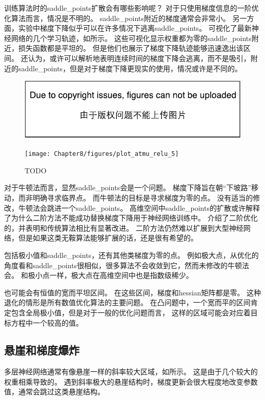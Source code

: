 训练算法时的\gls{saddle_points}扩散会有哪些影响呢？
对于只使用梯度信息的一阶优化算法而言，情况是不明的。
\gls{saddle_points}附近的梯度通常会非常小。
另一方面，实验中梯度下降似乎可以在许多情况下逃离\gls{saddle_points}。
\cite{GoodfellowOptimization15}可视化了最新神经网络的几个学习轨迹，如所示。
这些可视化显示权重都为零的\gls{saddle_points}附近，损失函数都是平坦的。
但是他们也展示了梯度下降轨迹能够迅速逸出该区间。
\cite{GoodfellowOptimization15}还认为，或许可以解析地表明连续时间的梯度下降会逃离，而不是吸引，附近的\gls{saddle_points}，但是对于梯度下降更现实的使用，情况或许是不同的。

\begin{figure}[!htb]
\ifOpenSource
\centerline{\includegraphics{figure.pdf}}
\else
\centerline{\texttt{[image: Chapter8/figures/plot\_atmu\_relu\_5]}}
\fi
\caption{TODO}
\label{fig:chap8_plot_atmu_relu_5}
\end{figure}

对于牛顿法而言，显然\gls{saddle_points}会是一个问题。
梯度下降旨在朝``下坡路''移动，而非明确寻求临界点。
而牛顿法的目标是寻求梯度为零的点。
没有适当的修改，牛顿法会跳进一个\gls{saddle_points}。
高维空间中\gls{saddle_points}的扩散或许解释了为什么二阶方法不能成功替换梯度下降用于神经网络训练中。
\cite{Dauphin-et-al-NIPS2014-small}介绍了二阶优化的，并表明和传统算法相比有显著改进。
二阶方法仍然难以扩展到大型神经网络，但是如果这类无鞍算法能够扩展的话，还是很有希望的。


包括极小值和\gls{saddle_points}，还有其他类梯度为零的点。
例如极大点，从优化的角度看和\gls{saddle_points}很相似，很多算法不会收敛到它，然而未修改的牛顿法会。
和极小点一样，极大点在高维空间中也是指数级稀少。

也可能会有恒值的宽而平坦区间。
在这些区间，梯度和\gls{hessian}矩阵都是零。
这种退化的情形是所有数值优化算法的主要问题。
在凸问题中，一个宽而平的区间肯定包含全局极小值，但是对于一般的优化问题而言，
这样的区域可能会对应着目标方程中一个较高的值。


\subsection{悬崖和梯度爆炸}
\label{sec:cliffs_and_exploding_gradients}
多层神经网络通常有像悬崖一样的斜率较大区域，如所示。
这是由于几个较大的权重相乘导致的。
遇到斜率极大的悬崖结构时，梯度更新会很大程度地改变参数值，通常会跳过这类悬崖结构。

